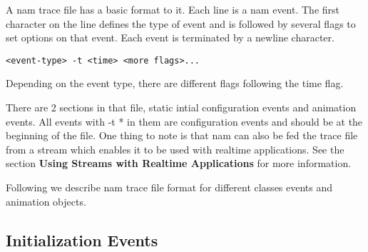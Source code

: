 A nam trace file has a basic format to it. Each line is a nam event. The first character on the line defines the type of event and is followed by several flags to set options on that event. Each event is terminated by a newline character.
\begin{verbatim}
<event-type> -t <time> <more flags>...
\end{verbatim}
Depending on the event type, there are different flags following the
time flag. 

There are 2 sections in that file, static intial configuration events and animation events.  All events with -t * in them are configuration events and should be at the beginning of the file.  One thing to note is that nam can also be fed the trace file from a stream which enables it to be used with realtime applications.  See the section \textbf{Using Streams with Realtime Applications} for more information.


Following we describe nam trace file format for different classes events and animation objects.

\subsection {Initialization Events}

